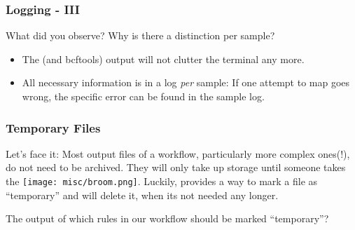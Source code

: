 \begin{frame}[fragile]
  \frametitle{Logging - III}
  \begin{question}[Questions]
  	 What did you observe? Why is there a distinction per sample?
  \end{question}
  \pause
  \begin{docs}[Answers]
  	\begin{itemize}[<+->]
  		\item The  (and bcftools) output will not clutter the terminal any more. 
  		\item All necessary information is in a log \emph{per} sample: If one attempt to map goes wrong, the specific error can be found in the sample log.
  	\end{itemize}
  \end{docs}
\end{frame}

\begin{frame}[fragile]
  \frametitle{Temporary Files}
  Let's face it: Most output files of a workflow, particularly more complex ones(!), do not need to be archived. They will only take up storage until someone takes the \texttt{[image: misc/broom.png]}.\newline
  Luckily, \Snakemake{} provides a way to mark a file as ``temporary'' and will delete it, when its not needed any longer.
  \pause
  \begin{question}
  	The output of which rules in our workflow should be marked ``temporary''?
  \end{question}
\end{frame}

